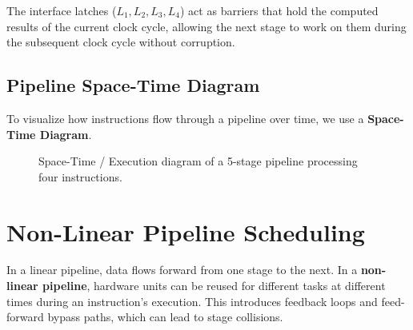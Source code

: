 \documentclass[12pt,a4paper,openany]{book}
\begin{document}
The interface latches ($L_1, L_2, L_3, L_4$) act as barriers that hold the computed results of the current clock cycle, allowing the next stage to work on them during the subsequent clock cycle without corruption.

\subsection{Pipeline Space-Time Diagram}
To visualize how instructions flow through a pipeline over time, we use a \textbf{Space-Time Diagram}.

\begin{figure}[htbp]
    \centering
    \caption{Space-Time / Execution diagram of a 5-stage pipeline processing four instructions.}
    \label{fig:space_time}
\end{figure}

\section{Non-Linear Pipeline Scheduling}
In a linear pipeline, data flows forward from one stage to the next. In a \textbf{non-linear pipeline}, hardware units can be reused for different tasks at different times during an instruction's execution. This introduces feedback loops and feed-forward bypass paths, which can lead to stage collisions.
\end{document}
